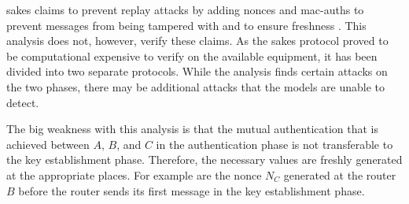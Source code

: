 \gls{sakes} claims to prevent replay attacks by adding nonces and \gls{mac-auth}s to prevent messages from being tampered with and to ensure freshness \cite{hussen2013sakes}. This analysis does not, however, verify these claims. As the \gls{sakes} protocol proved to be computational expensive to verify on the available equipment, it has been divided into two separate protocols. While the analysis finds certain attacks on the two phases, there may be additional attacks that the models are unable to detect.

The big weakness with this analysis is that the mutual authentication that is achieved between $A$, $B$, and $C$ in the authentication phase is not transferable to the key establishment phase. Therefore, the necessary values are freshly generated at the appropriate places. For example are the nonce $N_C$ generated at the router $B$ before the router sends its first message in the key establishment phase.  


















%
%
%
